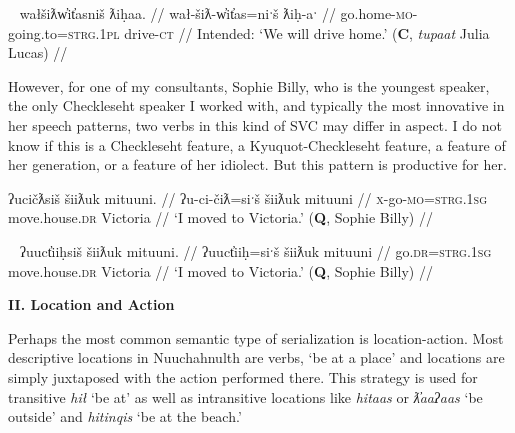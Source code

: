 \ex~ \label{ex:*drivehome}
\begingl
\glpreamble *wałšiƛw̓it̓asniš ƛiḥaa. //
\gla wał-šiƛ-w̓it̓as=niˑš ƛiḥ-aˑ //
\glb go.home-\textsc{mo}-going.to=\textsc{strg.1pl} drive-\textsc{ct} //
\glft Intended: `We will drive home.' (\textbf{C}, \textit{tupaat} Julia Lucas) //
\endgl
\xe

However, for one of my consultants, Sophie Billy, who is the youngest speaker, the only Checkleseht speaker I worked with, and typically the most innovative in her speech patterns, two verbs in this kind of SVC may differ in aspect. I do not know if this is a Checkleseht feature, a Kyuquot-Checkleseht feature, a feature of her generation, or a feature of her idiolect. But this pattern is productive for her.

\ex \label{ex:movetovictoria1}
\begingl
\glpreamble ʔucičƛsiš šiiƛuk mituuni. //
\gla ʔu-ci-čiƛ=siˑš šiiƛuk mituuni  //
\glb \textsc{x}-go-\textsc{mo}=\textsc{strg.1sg} move.house.\textsc{dr} Victoria //
\glft `I moved to Victoria.' (\textbf{Q}, Sophie Billy) //
\endgl
\xe

\ex~ \label{ex:movetovictoria2}
\begingl
\glpreamble ʔuuct̓iiḥsiš šiiƛuk mituuni. //
\gla ʔuuct̓iiḥ=siˑš šiiƛuk mituuni  //
\glb go.\textsc{dr}=\textsc{strg.1sg} move.house.\textsc{dr} Victoria //
\glft `I moved to Victoria.' (\textbf{Q}, Sophie Billy) //
\endgl
\xe

\begin{comment}
Ordering preference. One of my speakers expressed a strong preference for the manner verb to precede the action. This mirrors how adverbs are used in Nuuchahnulth, which also tend to precede the verb. Other speakers I consulted with were comfortable with the verbs coming in either order.

\ex \label{ex:gohomedrive}
\begingl
\glpreamble ʔucičƛsiš šiiƛuk mituuni. //
\gla ʔu-ci-čiƛ=siˑš šiiƛuk mituuni  //
\glb \textsc{x}-go-\textsc{mo}=\textsc{strg.1sg} move.house-\textsc{dr} Victoria //
\glft `I moved to Victoria.' (\textbf{Q}, Sophie Billy) //
\endgl
\xe
FH
*waałšiʔaƛs ƛiiƛiiḥataḥ.
waałšiʔaƛs. ƛiiƛiiḥataḥʔaƛs.
\end{comment}

\vspace{10pt}

\noindent \textbf{II. Location and Action}

\vspace{10pt}

Perhaps the most common semantic type of serialization is location-action. Most descriptive locations in Nuuchahnulth are verbs, `be at a place' and locations are simply juxtaposed with the action performed there. This strategy is used for transitive \textit{hił} `be at' as well as intransitive locations like \textit{hitaas} or \textit{ƛ̓aaʔaas} `be outside' and \textit{hitinqis} `be at the beach.'

